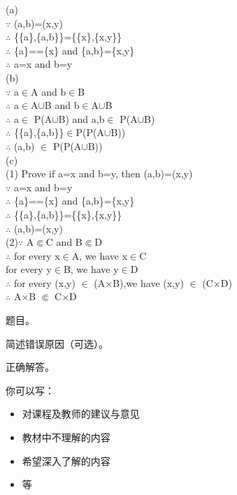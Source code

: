 \documentclass[11pt, a4paper, UTF8]{ctexart}
\begin{document}
\begin{solution}
(a)\\
$\because$ (a,b)=(x,y)\\
$\therefore$ \{\{a\},\{a,b\}\}=\{\{x\},\{x,y\}\}\\
$\therefore$ \{a\}==\{x\} and \{a,b\}=\{x,y\}\\
$\therefore$ a=x and b=y\\
(b)\\
$\because$ a$\in$A and b$\in$B\\
$\therefore$ a$\in$A$\cup$B and b$\in$A$\cup$B\\
$\therefore$ {a}$\in$ P(A$\cup$B) and {a,b}$\in$ P(A$\cup$B)\\
$\therefore$ \{\{a\},\{a,b\}\}$\in$P(P(A$\cup$B))\\
$\therefore$ (a,b) $\in$ P(P(A$\cup$B))\\
(c)\\
(1) Prove if a=x and b=y, then (a,b)=(x,y)\\
$\because$ a=x and b=y\\
$\therefore$ \{a\}==\{x\} and \{a,b\}=\{x,y\}\\
$\therefore$ \{\{a\},\{a,b\}\}=\{\{x\},\{x,y\}\}\\
$\therefore$ (a,b)=(x,y)\\
(2)$\because$ A$\Subset$C and B$\Subset$D\\
$\therefore$ for every x$\in$A, we have x$\in$C\\
\indent for every y$\in$B, we have y$\in$D\\
$\therefore$ for every (x,y) $\in$ (A$\times$B),we have (x,y) $\in$ (C$\times$D)\\
$\therefore$ A$\times$B $\Subset$ C$\times$D 

\end{solution}



\begincorrection	%

\begin{problem}[题号]
  题目。
\end{problem}

\begin{cause}
  简述错误原因（可选）。
\end{cause}

\begin{revision}
  正确解答。
\end{revision}
\beginfb	%

你可以写：
\begin{itemize}
  \item 对课程及教师的建议与意见
  \item 教材中不理解的内容
  \item 希望深入了解的内容
  \item 等
\end{itemize}
\end{document}
